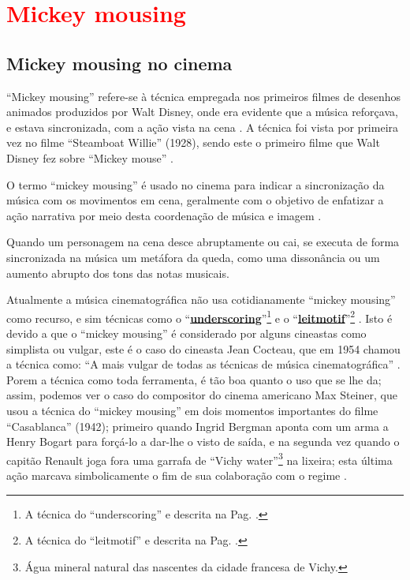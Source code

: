 

\section{\textcolor{red}{Mickey mousing}}
\label{sec:mikeymousing}


\subsection{Mickey mousing no cinema}

``Mickey mousing'' refere-se à técnica empregada nos primeiros filmes de desenhos animados produzidos por Walt Disney,
onde era evidente que a música reforçava, e estava sincronizada, 
com a ação vista na cena \cite{butterworth2011dance} \cite[pp. 62]{kalinak2010film}.
A técnica foi vista por primeira vez no filme ``Steamboat Willie'' (1928),
sendo este o primeiro filme que Walt Disney fez sobre ``Mickey mouse'' \cite[pp. 37]{wegele2014max}.

O termo ``mickey mousing'' é usado no cinema para indicar a sincronização da música com os movimentos em cena,
geralmente com o objetivo de enfatizar a ação narrativa por meio desta coordenação de música e imagem
  \cite{butterworth2011dance} \cite[pp. 62]{kalinak2010film}.


\begin{example}
Quando um personagem na cena desce abruptamente ou cai, 
se executa  de forma sincronizada na música um metáfora da queda,
como uma dissonância ou um aumento abrupto dos tons das notas musicais.
\end{example}

Atualmente a música cinematográfica não usa cotidianamente ``mickey mousing'' como recurso,
e sim técnicas como o ``\hyperref[ref:Underscoring]{\textbf{underscoring}}''\footnote{
A técnica do ``underscoring'' e descrita na Pag. \pageref{ref:Underscoring}.} e 
o ``\hyperref[subsec:LeitmotivCine]{\textbf{leitmotif}}''\footnote{
A técnica do ``leitmotif'' e descrita na Pag. \pageref{subsec:LeitmotivCine}.} \cite[pp. 37]{wegele2014max}.
Isto é devido a que o ``mickey mousing'' é considerado por alguns cineastas como simplista ou vulgar,
este é o caso do cineasta Jean Cocteau, que em 1954 chamou a técnica como: ``A mais vulgar de todas as técnicas de música cinematográfica'' \cite[pp. 37]{wegele2014max}.
Porem a técnica como toda ferramenta, é tão boa quanto o uso que se lhe da;
assim, podemos ver o caso do compositor do cinema americano Max Steiner,
que usou a técnica do ``mickey mousing'' em dois momentos importantes do filme ``Casablanca'' (1942);
primeiro quando Ingrid Bergman aponta com um arma a Henry Bogart para forçá-lo a dar-lhe o visto de saída,
e na segunda vez quando o capitão Renault joga fora uma garrafa de 
``Vichy water''\footnote{Água mineral natural das nascentes da cidade francesa de Vichy.} na lixeira;
esta última ação marcava simbolicamente o fim de sua colaboração com o regime \cite[pp. 38]{wegele2014max}.



